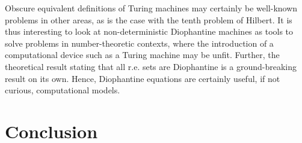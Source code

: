\documentclass[12pt]{article}
\begin{document}
Obscure equivalent definitions of Turing machines may certainly be well-known problems in other areas, as is the case with the tenth problem of Hilbert. It is thus interesting to look at non-deterministic Diophantine machines as tools to solve problems in number-theoretic contexts, where the introduction of a computational device such as a Turing machine may be unfit. Further, the theoretical result stating that all r.e. sets are Diophantine is a ground-breaking result on its own. Hence, Diophantine equations are certainly useful, if not curious, computational models.

\section{Conclusion}\label{sec:conc}



\end{document}
